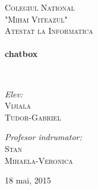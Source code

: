 \begin{titlepage}
\begin{center}

\textsc{\LARGE Colegiul National \\[0.5cm] "Mihai Viteazul"}\\[1.5cm]

\textsc{\Large Atestat la Informatica}\\[0.5cm]

\HRule \\[0.4cm]
{ \huge \bfseries chatbox \\[0.4cm] }

\HRule \\[1.5cm]

\noindent
\begin{minipage}[t]{0.4\textwidth}
\begin{flushleft} \large
\emph{Elev:}\\
\textsc{Vijiala\\Tudor-Gabriel}
\end{flushleft}
\end{minipage}%
\begin{minipage}[t]{0.4\textwidth}
\begin{flushright} \large
\emph{Profesor indrumator:} \\
\textsc{Stan\\ Mihaela-Veronica}
\end{flushright}
\end{minipage}

\vfill

{\large 18 mai, 2015}

\end{center}
\end{titlepage}